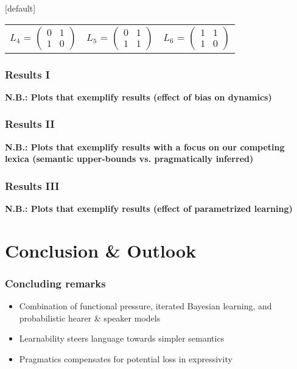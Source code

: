 \documentclass{beamer} %
\makeatletter
\newenvironment{withoutheadline}{
        \setbeamertemplate{headline}[default]
        \def\beamer@entrycode{\vspace*{-\headheight}}
    }{}
\makeatother
\begin{document}
\begin{withoutheadline}
\begin{frame}
\begin{table}
\begin{tabular}{l c l}
$L_4$ = $\begin{pmatrix} 0 & 1 \\ 1 & 0 \end{pmatrix}$ &
$L_5$ = $\begin{pmatrix} 0 & 1 \\ 1 & 1 \end{pmatrix}$ &
$L_6$ = $\begin{pmatrix} 1 & 1 \\ 1 & 0 \end{pmatrix}$

\end{tabular}
\end{table}
\end{frame}


\begin{frame}
	\frametitle{Results I}
{\bf N.B.: Plots that exemplify results (effect of bias on dynamics)}

\end{frame}




\begin{frame}
	\frametitle{Results II}

	{\bf N.B.: Plots that exemplify results with a focus on our competing lexica (semantic upper-bounds vs. pragmatically inferred)}

\end{frame}

\begin{frame}
	\frametitle{Results III}
{\bf N.B.: Plots that exemplify results (effect of parametrized learning)}

\end{frame}


\section{Conclusion \& Outlook}
\begin{frame}
	\frametitle{Concluding remarks}
\begin{itemize}\itemsep1em
		\item Combination of functional pressure, iterated Bayesian learning, and probabilistic hearer \& speaker models
		\item Learnability steers language towards simpler semantics
		\item Pragmatics compensates for potential loss in expressivity
	\end{itemize}
\end{frame}


\end{withoutheadline}
\end{document}
